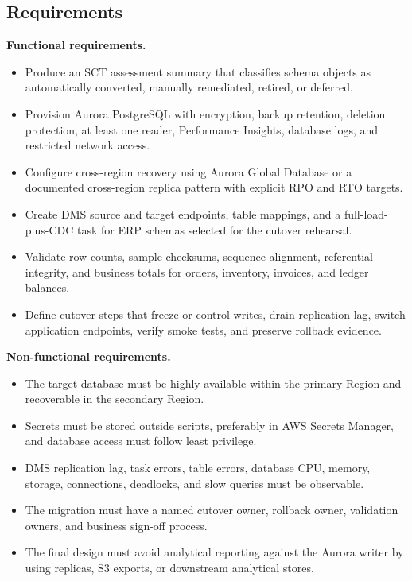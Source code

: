 \subsection*{Requirements}
\textbf{Functional requirements.}
\begin{itemize}
    \item Produce an SCT assessment summary that classifies schema objects as automatically converted, manually remediated, retired, or deferred.
    \item Provision Aurora PostgreSQL with encryption, backup retention, deletion protection, at least one reader, Performance Insights, database logs, and restricted network access.
    \item Configure cross-region recovery using Aurora Global Database or a documented cross-region replica pattern with explicit RPO and RTO targets.
    \item Create DMS source and target endpoints, table mappings, and a full-load-plus-CDC task for ERP schemas selected for the cutover rehearsal.
    \item Validate row counts, sample checksums, sequence alignment, referential integrity, and business totals for orders, inventory, invoices, and ledger balances.
    \item Define cutover steps that freeze or control writes, drain replication lag, switch application endpoints, verify smoke tests, and preserve rollback evidence.
\end{itemize}

\textbf{Non-functional requirements.}
\begin{itemize}
    \item The target database must be highly available within the primary Region and recoverable in the secondary Region.
    \item Secrets must be stored outside scripts, preferably in AWS Secrets Manager, and database access must follow least privilege.
    \item DMS replication lag, task errors, table errors, database CPU, memory, storage, connections, deadlocks, and slow queries must be observable.
    \item The migration must have a named cutover owner, rollback owner, validation owners, and business sign-off process.
    \item The final design must avoid analytical reporting against the Aurora writer by using replicas, S3 exports, or downstream analytical stores.
\end{itemize}

